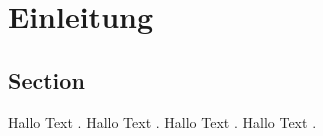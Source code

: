 %
%
\chapter{Einleitung}\label{chap.einleitung}
\glsresetall
\section{Section}\label{section.section}
Hallo Text \cite{Petermann:2015}.
Hallo Text \cite{Gehrig:2014}.
Hallo Text \cite{Mouratidou:2007}.
Hallo Text \cite{Petermann:1989}.



